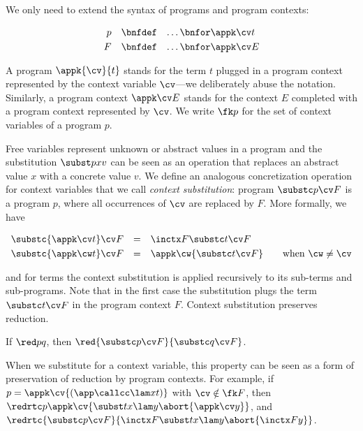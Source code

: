 \documentclass{lmcs}
\theoremstyle{defC}
\begin{document}
We only need to extend the syntax of programs and program contexts:

\[
\begin{array}{rcl}
  p & \bnfdef & \dots \bnfor \appk \cv t
  \\[1mm]
  F & \bnfdef & \dots \bnfor \appk \cv E
\end{array}
\]

\vspace{2mm}\noindent A program $\appk{\cv}{t}$ stands for the term
$t$ plugged in a program context represented by the context variable
$\cv$---we deliberately abuse the notation. Similarly, a program
context $\appk \cv E$ stands for the context $E$ completed with a
program context represented by $\cv$. We write $\fk p$ for the set of
context variables of a program $p$.

Free variables represent unknown or abstract values in a program and
the substitution $\subst p x v$ can be seen as an operation that
replaces an abstract value $x$ with a concrete value $v$.  We define
an analogous concretization operation for context variables that we
call \emph{context substitution}: program $\substc p \cv F$ is a
program $p$, where all occurrences of $\cv$ are replaced by $F$.  More
formally, we have

\[
\begin{array}{rcl}
\substc {\appk \cv t} \cv F & = & \inctx F {\substc t \cv F} \\[1mm]
\substc {\appk \cw t} \cv F & = & \appk \cw {\substc t \cv F}
\qquad \textrm{when $\cw \neq \cv$} %
\end{array}
\]

\vspace{2mm}\noindent and for terms the context substitution is
applied recursively to its sub-terms and sub-programs. Note that in
the first case the substitution plugs the term $\substc t \cv F$ in
the program context $F$. Context substitution preserves reduction.

\begin{lem}%
  \label{l:red-ab}
  If $\red p q$, then $\red{\substc p \cv F}{\substc q \cv F}$.
\end{lem}

\noindent
When we substitute for a context variable, this property can be seen
as a form of preservation of reduction by program contexts.  For
example, if $p = \appk \cv {(\app \callcc \lam x t)}$ with
$\cv \notin \fk F$, then
$\redrtc p {\appk \cv {\subst t x {\lam y {\abort {\appk \cv y}}}}}$,
and
$\redrtc {\substc p \cv F}{\inctx F {\subst t x {\lam y {\abort
        {\inctx F y}}}}}$.
\end{document}
